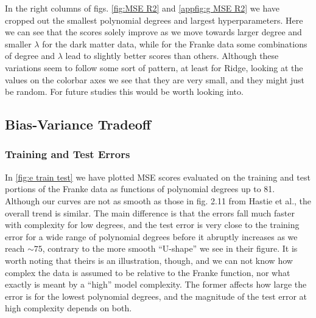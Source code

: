 \documentclass[aps,pra,english,notitlepage,reprint,nofootinbib]{revtex4-1}  %
\begin{document}
In the right columns of figs. \ref{fig:MSE R2} and \ref{appfig:g MSE R2} we have cropped out the smallest polynomial degrees and largest hyperparameters. Here we can see that the scores solely improve as we move towards larger degree and smaller $\lambda$ for the dark matter data, while for the Franke data some combinations of degree and $\lambda$ lead to slightly better scores than others. Although these variations seem to follow some sort of pattern, at least for Ridge, looking at the values on the colorbar axes we see that they are very small, and they might just be random. For future studies this would be worth looking into.


\subsection{Bias-Variance Tradeoff}
\subsubsection{Training and Test Errors}
In \cref{fig:e train test} we have plotted MSE scores evaluated on the training and test portions of the Franke data as functions of polynomial degrees up to 81. Although our curves are not as smooth as those in fig. 2.11 from Hastie et al., the overall trend is similar. The main difference is that the errors fall much faster with complexity for low degrees, and the test error is very close to the training error for a wide range of polynomial degrees before it abruptly increases as we reach $\sim75$, contrary to the more smooth ``U-shape'' we see in their figure. It is worth noting that theirs is an illustration, though, and we can not know how complex the data is assumed to be relative to the Franke function, nor what exactly is meant by a ``high'' model complexity. The former affects how large the error is for the lowest polynomial degrees, and the magnitude of the test error at high complexity depends on both. 
\end{document}
